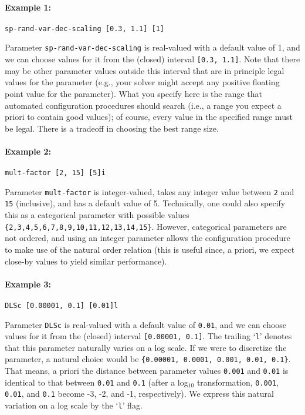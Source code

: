 \documentclass[manual.tex]{subfiles}
\begin{document}
\paragraph{Example 1:}

\begin{verbatim}
sp-rand-var-dec-scaling [0.3, 1.1] [1]
\end{verbatim}
Parameter \texttt{sp-rand-var-dec-scaling} is real-valued with a default value of 1, and we can choose values for it from the (closed) interval \texttt{[0.3, 1.1]}.
Note that there may be other parameter values outside this interval that are in principle legal values for the parameter (e.g., your solver might accept any positive floating point value for the parameter). What you specify here is the range that automated configuration procedures should search (i.e., a range you expect a priori to contain good values); of course, every value in the specified range must be legal. There is a tradeoff in choosing the best range size.%

\paragraph{Example 2:}
\begin{verbatim}
mult-factor [2, 15] [5]i
\end{verbatim}
Parameter \texttt{mult-factor} is integer-valued, takes any integer value between \texttt{2} and \texttt{15} (inclusive), and has a default value of 5. 
Technically, one could also specify this as a categorical parameter with possible values \texttt{\{2,3,4,5,6,7,8,9,10,11,12,13,14,15\}}. 
However, categorical parameters are not ordered, and using an integer parameter allows the configuration procedure to make use of the natural order relation (this is useful since, a priori, we expect close-by values to yield similar performance).

\paragraph{Example 3:}
\begin{verbatim}
DLSc [0.00001, 0.1] [0.01]l
\end{verbatim}
Parameter \texttt{DLSc} is real-valued with a default value of \texttt{0.01}, and we can choose values for it from the (closed) interval \texttt{[0.00001, 0.1]}.
The trailing `\texttt{l}' denotes that this parameter naturally varies on a log scale. If we were to discretize the parameter, a natural choice would be
\texttt{\{0.00001, 0.0001, 0.001, 0.01, 0.1\}}. That means, a priori the distance between parameter values \texttt{0.001} and \texttt{0.01} is identical to that between \texttt{0.01} and \texttt{0.1} (after a log$_{10}$ transformation, \texttt{0.001}, \texttt{0.01}, and \texttt{0.1} become -3, -2, and -1, respectively).
We express this natural variation on a log scale by the `\texttt{l}' flag. %
\end{document}
